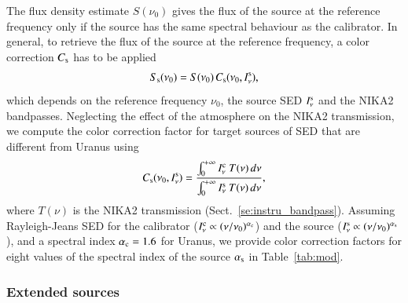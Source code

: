 The flux density estimate $S(\nu_{0})$ gives the
flux of the source at the reference frequency only if the source has
the same spectral behaviour as the calibrator. In general, to retrieve the
flux of the source at the reference frequency, a color correction
$C_{\rm{s}}$ has to be applied
\begin{equation}
S_{\rm{s}}(\nu_{0}) = S(\nu_{0}) \,  C_{\rm{s}}(\nu_{0}, I_\nu^{\rm{s}}),
\end{equation}
which depends on the reference frequency $\nu_{0}$, the source
SED $I_\nu^{\rm{s}}$ and the NIKA2 bandpasses.
Neglecting the effect of the atmosphere on the NIKA2 transmission, we
compute the color correction factor for target sources of SED that are
different from Uranus using
\begin{equation}
  C_{\rm{s}}(\nu_{0}, I_\nu^{\rm{s}}) = \frac{\int_{0}^{+\infty} I_\nu^{\rm{c}}~T({\nu})\, d\nu}{ \int_{0}^{+\infty} I_\nu^{\rm{s}}~ T({\nu})\, d\nu},
    \label{eq:color_correction}
\end{equation}
where $T({\nu})$ is the NIKA2 transmission
(Sect.~\ref{se:instru_bandpass}).
Assuming Rayleigh-Jeans SED for the calibrator
($I_\nu^{\rm{c}} \propto (\nu/\nu_0)^{\alpha_{\rm{c}}}$) and the source
($I_\nu^{\rm{s}} \propto (\nu/\nu_0)^{\alpha_{\rm{s}}}$), and a
spectral index $\alpha_{\rm{c}} = 1.6$ for Uranus, we provide color
correction factors for eight values of the spectral index of the
source $\alpha_{\rm{s}}$ in Table~\ref{tab:mod}.


\subsubsection{Extended sources}
\label{se:extended_source_calib}

